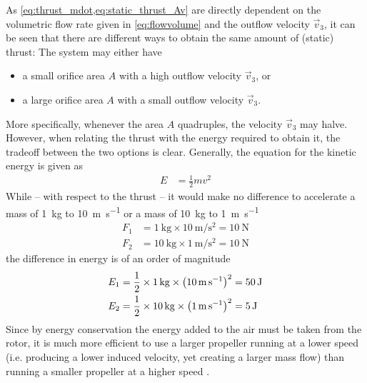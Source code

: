 As \cref{eq:thrust_mdot,eq:static_thrust_Av} are directly dependent on the volumetric flow rate given in \cref{eq:flowvolume} and the outflow velocity $\vec{v}_3$, 
it can be seen that there are different ways to obtain the same amount of (static) thrust: The system may either have

\begin{itemize}
	\item a small orifice area $A$ with a high outflow velocity $\vec{v}_{3}$, or
	\item a large orifice area $A$ with a small outflow velocity $\vec{v}_{3}$.
\end{itemize}

More specifically, whenever the area $A$ quadruples, the velocity $\vec{v}_{3}$ may halve.
However, when relating the thrust with the energy required to obtain it, the tradeoff between the two options is clear. 
Generally, the equation for the kinetic energy is given as
%
\begin{align}
E &= \frac{1}{2} m v^2
\end{align}
%
While -- with respect to the thrust -- it would make no difference to accelerate a mass of \SI{1}{\kilo\gram} to \SI{10}{\meter\per\second} or a mass of \SI{10}{\kilo\gram} to \SI{1}{\meter\per\second}
%
\begin{align*}
F_1 &= \SI{1}{\kilo\gram} \times \SI{10}{\meter\per\second^2} = \SI{10}{\newton} \\
F_2 &= \SI{10}{\kilo\gram} \times \SI{1}{\meter\per\second^2} = \SI{10}{\newton}
\end{align*}
%
the difference in energy is of an order of magnitude
%
\begin{align*}
E_1 &= \frac{1}{2} \times \SI{1}{\kilo\gram} \times \left( \SI{10}{\meter\per\second} \right)^2 = \SI{50}{\joule} \\
E_2 &= \frac{1}{2} \times \SI{10}{\kilo\gram} \times \left( \SI{1}{\meter\per\second} \right)^2 = \SI{5}{\joule}
\end{align*}
%
Since by energy conservation the energy added to the air must be taken from the rotor, it is much more efficient to use a larger propeller running at a lower speed (i.e. producing a lower induced velocity, yet creating a larger mass flow) than running a smaller propeller at a higher speed \cite{book:mechflight2006}.


